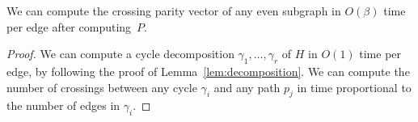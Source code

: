 \begin{lemma}
We can compute the crossing parity vector of any even subgraph in $O(\beta)$ time per edge after computing~$P$.
\end{lemma}

\begin{proof}
We can compute a cycle decomposition $\gamma_1, \dots, \gamma_r$ of $H$ in $O(1)$ time per edge, by following the proof of Lemma~\ref{lem:decomposition}.
We can compute the number of crossings between any cycle $\gamma_i$ and any path $p_j$ in time proportional to the number of edges in $\gamma_i$.
\end{proof}
